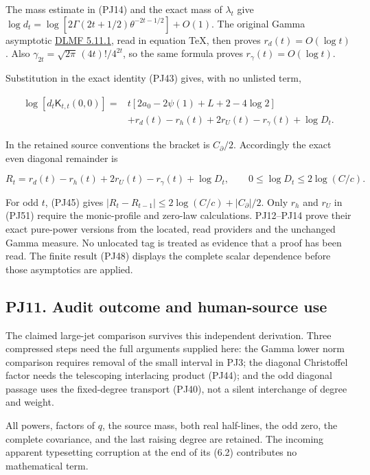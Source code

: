 \documentclass[10pt]{article}
\begin{document}
The mass estimate in (PJ14) and the exact mass of \(\lambda_t\) give \(\log d_t=\log[2\Gamma(2t+1/2)\theta^{-2t-1/2}]+O(1)\). The original Gamma asymptotic \href{https://dlmf.nist.gov/5.11.E1}{DLMF 5.11.1}, read in equation TeX, then proves \(r_d(t)=O(\log t)\). Also \(\gamma_{2t}=\sqrt{2\pi}\,(4t)!/4^{2t}\), so the same formula proves \(r_\gamma(t)=O(\log t)\).

Substitution in the exact identity (PJ43) gives, with no unlisted term,

\[
\begin{aligned}
\log[d_t\mathsf K_{t,t}(0,0)]
={}&t[2a_0-2\psi(1)+L+2-4\log2]\\
&+r_d(t)-r_h(t)+2r_U(t)-r_\gamma(t)+\log D_t.
\end{aligned}
\tag{PJ50}
\]

In the retained source conventions the bracket is \(C_\partial/2\). Accordingly the exact even diagonal remainder is

\[
R_t=r_d(t)-r_h(t)+2r_U(t)-r_\gamma(t)+\log D_t,
\qquad 0\le\log D_t\le2\log(C/c).
\tag{PJ51}
\]

For odd \(t\), (PJ45) gives \(|R_t-R_{t-1}|\le2\log(C/c)+|C_\partial|/2\). Only \(r_h\) and \(r_U\) in (PJ51) require the monic-profile and zero-law calculations. PJ12--PJ14 prove their exact pure-power versions from the located, read providers and the unchanged Gamma measure. No unlocated tag is treated as evidence that a proof has been read. The finite result (PJ48) displays the complete scalar dependence before those asymptotics are applied.

\subsection{PJ11. Audit outcome and human-source use}\label{pj11.-audit-outcome-and-human-source-use}

The claimed large-jet comparison survives this independent derivation. Three compressed steps need the full arguments supplied here: the Gamma lower norm comparison requires removal of the small interval in PJ3; the diagonal Christoffel factor needs the telescoping interlacing product (PJ44); and the odd diagonal passage uses the fixed-degree transport (PJ40), not a silent interchange of degree and weight.

All powers, factors of \(q\), the source mass, both real half-lines, the odd zero, the complete covariance, and the last raising degree are retained. The incoming apparent typesetting corruption at the end of its (6.2) contributes no mathematical term.
\end{document}
